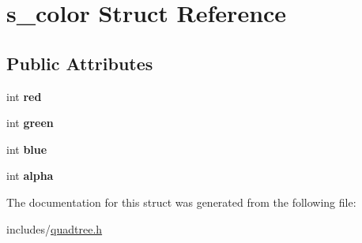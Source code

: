 \hypertarget{structs__color}{}\section{s\+\_\+color Struct Reference}
\label{structs__color}
\subsection*{Public Attributes}
\begin{DoxyCompactItemize}
\item 
\mbox{\label{structs__color_aa888f65414cd254792077c432d0aeda3}} 
int {\bfseries red}
\item 
\mbox{\label{structs__color_ab350b2d45b8aac3ab12d86208b79f022}} 
int {\bfseries green}
\item 
\mbox{\label{structs__color_aee37382685e2a42a16a47c6d1b64724e}} 
int {\bfseries blue}
\item 
\mbox{\label{structs__color_afd57115f3b1ec528530ad9a0425cdad6}} 
int {\bfseries alpha}
\end{DoxyCompactItemize}


The documentation for this struct was generated from the following file\+:\begin{DoxyCompactItemize}
\item 
includes/\hyperlink{quadtree_8h}{quadtree.\+h}\end{DoxyCompactItemize}
